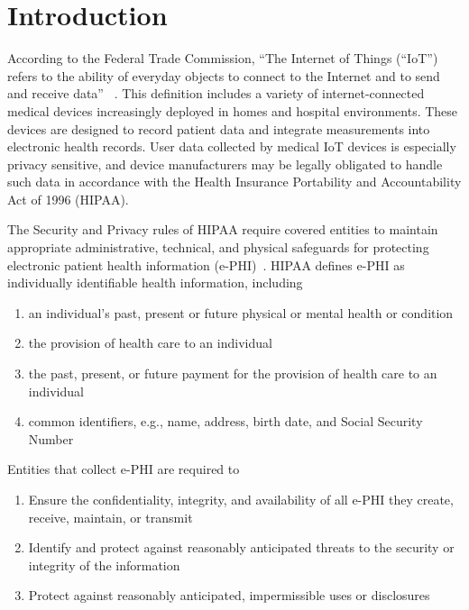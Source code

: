\section{Introduction}

According to the Federal Trade Commission, ``The Internet of Things (``IoT'') refers to the ability of everyday objects to connect to the Internet and to send and receive data'' ~\cite{ftc}. This definition includes a variety of internet-connected medical devices increasingly deployed in homes and hospital environments. These devices are designed to record patient data and integrate measurements into electronic health records. User data collected by medical IoT devices is especially privacy sensitive, and device manufacturers may be legally obligated to handle such data in accordance with the Health Insurance Portability and Accountability Act of 1996 (HIPAA). 

The Security and Privacy rules of HIPAA require covered entities to maintain appropriate administrative, technical, and physical safeguards for protecting electronic patient health information (e-PHI)~\cite{securityHIPAArule, privacyHIPAArule}.   HIPAA defines e-PHI as individually identifiable health information, including
\begin{enumerate}
  \item an individual's past, present or future physical or mental health or condition
  \item the provision of health care to an individual
  \item the past, present, or future payment for the provision of health care to an individual
  \item common identifiers, e.g., name, address, birth date, and  Social Security Number
\end{enumerate}
Entities that collect e-PHI are required to 
\begin{enumerate}
  \item Ensure the confidentiality, integrity, and availability of all e-PHI they create, receive, maintain, or transmit
  \item Identify and protect against reasonably anticipated threats to the security or integrity of the information
  \item Protect against reasonably anticipated, impermissible uses or disclosures
\end{enumerate}



